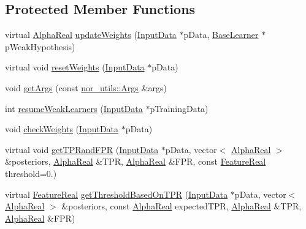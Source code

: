 \subsection*{Protected Member Functions}
\begin{DoxyCompactItemize}
\item 
virtual \hyperlink{Defaults_8h_a80184c4fd10ab70a1a17c5f97dcd1563}{Alpha\-Real} \hyperlink{classMultiBoost_1_1VJCascadeLearner_a75932618ef9d9cae65f01aca01882320}{update\-Weights} (\hyperlink{classMultiBoost_1_1InputData}{Input\-Data} $\ast$p\-Data, \hyperlink{classMultiBoost_1_1BaseLearner}{Base\-Learner} $\ast$p\-Weak\-Hypothesis)
\item 
virtual void \hyperlink{classMultiBoost_1_1VJCascadeLearner_a022cab386437b6a22036a8801725b9c3}{reset\-Weights} (\hyperlink{classMultiBoost_1_1InputData}{Input\-Data} $\ast$p\-Data)
\item 
void \hyperlink{classMultiBoost_1_1VJCascadeLearner_a85852f49b6f84c26ce907109503acc29}{get\-Args} (const \hyperlink{classnor__utils_1_1Args}{nor\-\_\-utils\-::\-Args} \&args)
\item 
int \hyperlink{classMultiBoost_1_1VJCascadeLearner_a989ebcf460dda4102b14bd59907abd43}{resume\-Weak\-Learners} (\hyperlink{classMultiBoost_1_1InputData}{Input\-Data} $\ast$p\-Training\-Data)
\item 
void \hyperlink{classMultiBoost_1_1VJCascadeLearner_a6e5c7d2f07945b1bb87148d7c5f384ab}{check\-Weights} (\hyperlink{classMultiBoost_1_1InputData}{Input\-Data} $\ast$p\-Data)
\item 
virtual void \hyperlink{classMultiBoost_1_1VJCascadeLearner_a32c694530064e3db40e95f9041f38430}{get\-T\-P\-Rand\-F\-P\-R} (\hyperlink{classMultiBoost_1_1InputData}{Input\-Data} $\ast$p\-Data, vector$<$ \hyperlink{Defaults_8h_a80184c4fd10ab70a1a17c5f97dcd1563}{Alpha\-Real} $>$ \&posteriors, \hyperlink{Defaults_8h_a80184c4fd10ab70a1a17c5f97dcd1563}{Alpha\-Real} \&T\-P\-R, \hyperlink{Defaults_8h_a80184c4fd10ab70a1a17c5f97dcd1563}{Alpha\-Real} \&F\-P\-R, const \hyperlink{Defaults_8h_a3a11cfe6a5d469d921716ca6291e934f}{Feature\-Real} threshold=0.)
\item 
virtual \hyperlink{Defaults_8h_a3a11cfe6a5d469d921716ca6291e934f}{Feature\-Real} \hyperlink{classMultiBoost_1_1VJCascadeLearner_a9268603874feef64d7562b04f133e7e0}{get\-Threshold\-Based\-On\-T\-P\-R} (\hyperlink{classMultiBoost_1_1InputData}{Input\-Data} $\ast$p\-Data, vector$<$ \hyperlink{Defaults_8h_a80184c4fd10ab70a1a17c5f97dcd1563}{Alpha\-Real} $>$ \&posteriors, const \hyperlink{Defaults_8h_a80184c4fd10ab70a1a17c5f97dcd1563}{Alpha\-Real} expected\-T\-P\-R, \hyperlink{Defaults_8h_a80184c4fd10ab70a1a17c5f97dcd1563}{Alpha\-Real} \&T\-P\-R, \hyperlink{Defaults_8h_a80184c4fd10ab70a1a17c5f97dcd1563}{Alpha\-Real} \&F\-P\-R)

\end{DoxyCompactItemize}

